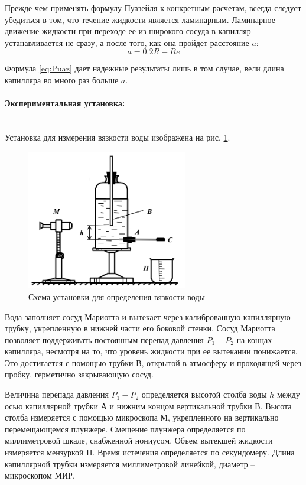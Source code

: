 \documentclass[a4paper, 12pt]{article}
\newcommand{\parag}[1]{\paragraph*{#1:}}
\begin{document}
Прежде чем применять формулу Пуазейля к конкретным расчетам, всегда следует убедиться в том, что течение жидкости является ламинарным. Ламинарное движение жидкости при переходе ее из широкого сосуда в капилляр устанавливается не сразу, а после того, как она пройдет расстояние $a$:
\begin{equation}
    a = 0.2R - Re
    \label{eq:A}
\end{equation}

Формула \ref{eq:Puaz} дает надежные результаты лишь в том случае, вели длина капилляра во много раз больше $a$.

\parag {Экспериментальная установка}~\\
Установка для измерения вязкости воды изображена на рис. \ref{fig:vac}. 

\begin{figure}[h]
    \centering
    \includegraphics[width=7cm]{setup1.PNG}
    \caption{Схема установки для определения вязкости воды}
    \label{fig:vac}
\end{figure}

Вода заполняет сосуд Мариотта и вытекает через калиброванную капиллярную трубку, укрепленную в нижней части его боковой стенки. Сосуд Мариотта позволяет поддерживать постоянным перепад давления $P_1 - P_2$ на концах капилляра, несмотря на то, что уровень жидкости при ее вытекании понижается. Это достигается с помощью трубки $В$, открытой в атмосферу и проходящей через пробку, герметично закрывающую сосуд.

Величина перепада давления $P_1 - P_2$ определяется высотой столба воды $h$ между осью капиллярной трубки $А$ и нижним концом вертикальной трубки $В$. Высота столба измеряется с помощью микроскопа $М$, укрепленного на вертикально перемещающемся плунжере. Смещение плунжера определяется по миллиметровой шкале, снабженной нониусом. Объем вытекшей жидкости измеряется мензуркой $П$. Время истечения определяется по секундомеру. Длина капиллярной трубки измеряется миллиметровой линейкой, диаметр -- микроскопом МИР.
\end{document}
